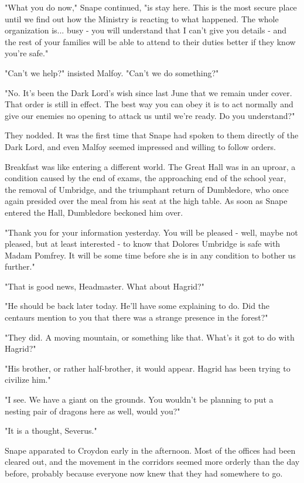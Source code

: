 \documentclass[a4paper,11pt]{article}
\begin{document}
"What you do now," Snape continued, "is stay here. This is the most secure place until we find out how the Ministry is reacting to what happened. The whole organization is... busy - you will understand that I can't give you details - and the rest of your families will be able to attend to their duties better if they know you're safe."

"Can't we help?" insisted Malfoy. "Can't we do something?"

"No. It's been the Dark Lord's wish since last June that we remain under cover. That order is still in effect. The best way you can obey it is to act normally and give our enemies no opening to attack us until we're ready. Do you understand?"

They nodded. It was the first time that Snape had spoken to them directly of the Dark Lord, and even Malfoy seemed impressed and willing to follow orders.

Breakfast was like entering a different world. The Great Hall was in an uproar, a condition caused by the end of exams, the approaching end of the school year, the removal of Umbridge, and the triumphant return of Dumbledore, who once again presided over the meal from his seat at the high table. As soon as Snape entered the Hall, Dumbledore beckoned him over.

"Thank you for your information yesterday. You will be pleased - well, maybe not pleased, but at least interested - to know that Dolores Umbridge is safe with Madam Pomfrey. It will be some time before she is in any condition to bother us further."

"That is good news, Headmaster. What about Hagrid?"

"He should be back later today. He'll have some explaining to do. Did the centaurs mention to you that there was a strange presence in the forest?"

"They did. A moving mountain, or something like that. What's it got to do with Hagrid?"

"His brother, or rather half-brother, it would appear. Hagrid has been trying to civilize him."

"I see. We have a giant on the grounds. You wouldn't be planning to put a nesting pair of dragons here as well, would you?"

"It is a thought, Severus."

Snape apparated to Croydon early in the afternoon. Most of the offices had been cleared out, and the movement in the corridors seemed more orderly than the day before, probably because everyone now knew that they had somewhere to go.
\end{document}
